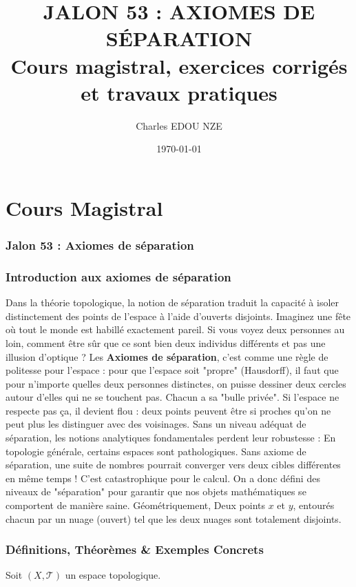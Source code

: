 \documentclass[11pt,a4paper]{article}
\title{\Huge JALON 53 : AXIOMES DE SÉPARATION \\ \large Cours magistral, exercices corrigés et travaux pratiques}
\author{\Large Charles EDOU NZE}
\date{\today}
\begin{document}
\maketitle
\tableofcontents
\newpage

\part{Cours Magistral}


\section*{Jalon 53 : Axiomes de séparation}

\section{Introduction aux axiomes de séparation}

Dans la théorie topologique, la notion de séparation traduit la capacité à isoler distinctement des points de l'espace à l'aide d'ouverts disjoints. Imaginez une fête où tout le monde est habillé exactement pareil. Si vous voyez deux personnes au loin, comment être sûr que ce sont bien deux individus différents et pas une illusion d'optique ? Les \textbf{Axiomes de séparation}, c'est comme une règle de politesse pour l'espace : pour que l'espace soit "propre" (Hausdorff), il faut que pour n'importe quelles deux personnes distinctes, on puisse dessiner deux cercles autour d'elles qui ne se touchent pas. Chacun a sa "bulle privée". Si l'espace ne respecte pas ça, il devient flou : deux points peuvent être si proches qu'on ne peut plus les distinguer avec des voisinages.
Sans un niveau adéquat de séparation, les notions analytiques fondamentales perdent leur robustesse : En topologie générale, certains espaces sont pathologiques. Sans axiome de séparation, une suite de nombres pourrait converger vers deux cibles différentes en même temps ! C'est catastrophique pour le calcul. On a donc défini des niveaux de "séparation" pour garantir que nos objets mathématiques se comportent de manière saine.
Géométriquement, Deux points $x$ et $y$, entourés chacun par un nuage (ouvert) tel que les deux nuages sont totalement disjoints.

\section{Définitions, Théorèmes \& Exemples Concrets}

Soit $(X, \mathcal{T})$ un espace topologique.
\end{document}
